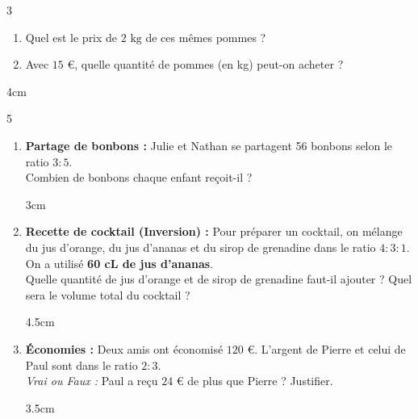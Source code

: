\documentclass[a4paper]{book}
\begin{document}
{\begin{exerciceNote}{3}
\begin{enumerate}
            \vspace{1cm}
        
            \item Quel est le prix de $2 \text{ kg}$ de ces mêmes pommes ?
            \item Avec $15$ \euro, quelle quantité de pommes (en kg) peut-on acheter ? 
        \end{enumerate}
        
        \begin{ZoneReponse}{4cm}
        \end{ZoneReponse}
    \end{exerciceNote}


\newpage


    \begin{exerciceNote}{5} %
        \begin{enumerate}
            \item \textbf{Partage de bonbons :} 
            Julie et Nathan se partagent 56 bonbons selon le ratio $3:5$. \\
            Combien de bonbons chaque enfant reçoit-il ?
        
            \begin{ZoneReponse}{3cm}
            \end{ZoneReponse}
            
            \item \textbf{Recette de cocktail (Inversion) :} 
            Pour préparer un cocktail, on mélange du jus d'orange, du jus d'ananas et du sirop de grenadine dans le ratio $4:3:1$. 
            On a utilisé \textbf{60 cL de jus d'ananas}. \\
            Quelle quantité de jus d'orange et de sirop de grenadine faut-il ajouter ? Quel sera le volume total du cocktail ?
            
            \begin{ZoneReponse}{4.5cm}
            \end{ZoneReponse}
            
            \item \textbf{Économies :}
            Deux amis ont économisé $120$ \euro. L'argent de Pierre et celui de Paul sont dans le ratio $2:3$.\\
            \textit{Vrai ou Faux :} Paul a reçu $24$ \euro{} de plus que Pierre ? Justifier.
            
            \begin{ZoneReponse}{3.5cm}
            \end{ZoneReponse}
        \end{enumerate}
    \end{exerciceNote}


}
\end{document}
